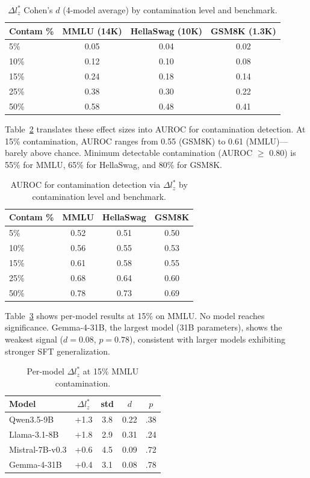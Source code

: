 \documentclass[11pt,a4paper]{article}
\begin{document}
\begin{table}[t]
\centering
\small
\begin{tabular}{lccc}
\toprule
Contam \% & MMLU (14K) & HellaSwag (10K) & GSM8K (1.3K) \\
\midrule
5\% & 0.05 & 0.04 & 0.02 \\
10\% & 0.12 & 0.10 & 0.08 \\
15\% & 0.24 & 0.18 & 0.14 \\
25\% & 0.38 & 0.30 & 0.22 \\
50\% & 0.58 & 0.48 & 0.41 \\
\bottomrule
\end{tabular}
\caption{$\Delta l_{z}^{*}$ Cohen's $d$ (4-model average) by contamination level and benchmark.}
\label{tab:cohen_d}
\end{table}

Table~\ref{tab:auroc} translates these effect sizes into AUROC for contamination detection.
At 15\% contamination, AUROC ranges from 0.55 (GSM8K) to 0.61 (MMLU)---barely above chance.
Minimum detectable contamination (AUROC $\geq$ 0.80) is 55\% for MMLU, 65\% for HellaSwag, and 80\% for GSM8K.

\begin{table}[t]
\centering
\small
\begin{tabular}{lccc}
\toprule
Contam \% & MMLU & HellaSwag & GSM8K \\
\midrule
5\% & 0.52 & 0.51 & 0.50 \\
10\% & 0.56 & 0.55 & 0.53 \\
15\% & 0.61 & 0.58 & 0.55 \\
25\% & 0.68 & 0.64 & 0.60 \\
50\% & 0.78 & 0.73 & 0.69 \\
\bottomrule
\end{tabular}
\caption{AUROC for contamination detection via $\Delta l_{z}^{*}$ by contamination level and benchmark.}
\label{tab:auroc}
\end{table}

Table~\ref{tab:per_model} shows per-model results at 15\% on MMLU. No model reaches significance.
Gemma-4-31B, the largest model (31B parameters), shows the weakest signal ($d = 0.08$, $p = 0.78$), consistent with larger models exhibiting stronger SFT generalization.

\begin{table}[t]
\centering
\small
\begin{tabular}{lcccc}
\toprule
Model & $\Delta l_{z}^{*}$ & std & $d$ & $p$ \\
\midrule
Qwen3.5-9B & +1.3 & 3.8 & 0.22 & .38 \\
Llama-3.1-8B & +1.8 & 2.9 & 0.31 & .24 \\
Mistral-7B-v0.3 & +0.6 & 4.5 & 0.09 & .72 \\
Gemma-4-31B & +0.4 & 3.1 & 0.08 & .78 \\
\bottomrule
\end{tabular}
\caption{Per-model $\Delta l_{z}^{*}$ at 15\% MMLU contamination.}
\label{tab:per_model}
\end{table}
\end{document}
